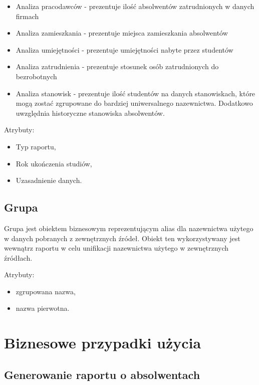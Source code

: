 \begin{itemize}
\item Analiza pracodawców - prezentuje ilość absolwentów zatrudnionych w danych firmach
\item Analiza zamieszkania - prezentuje miejsca zamieszkania absolwentów
\item Analiza umiejętności - prezentuje umiejętności nabyte przez studentów
\item Analiza zatrudnienia - prezentuje stosunek osób zatrudnionych do bezrobotnych
\item Analiza stanowisk - prezentuje ilość studentów na danych stanowiskach, które mogą zostać zgrupowane do bardziej uniwersalnego nazewnictwa. Dodatkowo uwzględnia historyczne stanowiska absolwentów.
\end{itemize}

Atrybuty:

\begin{itemize}
\item Typ raportu,
\item Rok ukończenia studiów,
\item Uzasadnienie danych.
\end{itemize}

\subsection{Grupa}
\label{subsection-grupa}

Grupa jest obiektem biznesowym reprezentującym alias dla nazewnictwa użytego w danych pobranych z zewnętrznych źródeł. Obiekt ten wykorzystywany jest wewnątrz raportu w celu unifikacji nazewnictwa użytego w zewnętrznych źródłach.

Atrybuty:

\begin{itemize}
\item zgrupowana nazwa,
\item nazwa pierwotna.
\end{itemize}

\pagebreak
\section{Biznesowe przypadki użycia}
\label{Chapter23}

\subsection{Generowanie raportu o absolwentach}

